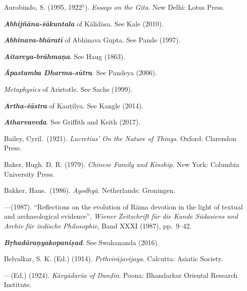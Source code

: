 \thispagestyle{plain}


\begin{thebibliography}{99}
\label{bibliography}
\itemsep=2pt
{Aurobindo, S.} (1995, 1922$^{1}$). {\sl Essays on the Gita}. New Delhi: Lotus Press. 

{\sl\bfseries Abhijñāna-śākuntala} of Kālidāsa. See Kale (2010). 

{\sl\bfseries Abhinava-bhāratī} of Abhinava Gupta. See Pande (1997).

{\sl\bfseries Aitareya-brāhmaṇa}. See Haug (1863).

{\sl\bfseries Āpastamba Dharma-sūtra}. See Pandeya (2006).

{\sl Metaphysics} of Aristotle. See Sachs (1999).

{\sl\bfseries Artha-śāstra} of Kauṭilya. See Kangle (2014).  

{\sl\bfseries Atharvaveda}. See Griffith and Keith (2017).

Bailey, Cyril.\ (1921). {\sl Lucretius’ On the Nature of Things}. Oxford: Clarendon Press. 

Baker, Hugh. D. R. (1979). {\sl Chinese Family and Kinship}. New York: Columbia University Press. 

Bakker, Hans.\ (1986). {\sl Ayodhyā}. Netherlands: Groningen. 

---\kern3pt(1987). “Reflections on the evolution of Rāma devotion in the light of textual and archaeological evidence”, {\sl Wiener Zeitschrift für die Kunde Südasiens und Archiv für indische Philosophie}, Band XXXI (1987), pp.~9--42. 

{\sl\bfseries Bṛhadāraṇyakopaniṣad}. See Swahananda (2016).

Belvalkar, S. K. (Ed.) (1914). {\sl Pṛthvīrājavijaya.} Calcutta: Asiatic Society.

---\kern3pt(Ed.) (1924). {\sl Kāvyādarśa of Danḍin}.  Poona: Bhandarkar Oriental Research Institute. 


\end{thebibliography}
